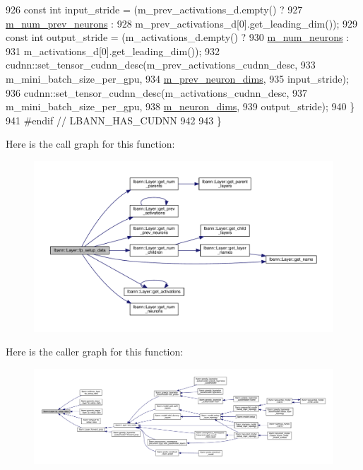 \begin{DoxyCode}
926     \textcolor{keyword}{const} \textcolor{keywordtype}{int} input\_stride = (m\_prev\_activations\_d.empty() ?
927                               \hyperlink{classlbann_1_1Layer_ac7b30f4e28d58204bfcbb76886f9136d}{m\_num\_prev\_neurons} :
928                               m\_prev\_activations\_d[0].get\_leading\_dim());
929     \textcolor{keyword}{const} \textcolor{keywordtype}{int} output\_stride = (m\_activations\_d.empty() ?
930                                \hyperlink{classlbann_1_1Layer_a6b5ebc8a7d9329d8a773ed787e7b41d8}{m\_num\_neurons} :
931                                m\_activations\_d[0].get\_leading\_dim());
932     cudnn::set\_tensor\_cudnn\_desc(m\_prev\_activations\_cudnn\_desc,
933                                  m\_mini\_batch\_size\_per\_gpu,
934                                  \hyperlink{classlbann_1_1Layer_ae204d1a2a79606eaa117273857ff62a3}{m\_prev\_neuron\_dims},
935                                  input\_stride);
936     cudnn::set\_tensor\_cudnn\_desc(m\_activations\_cudnn\_desc,
937                                  m\_mini\_batch\_size\_per\_gpu,
938                                  \hyperlink{classlbann_1_1Layer_abb34bb8031f57a483e2e327a5f229f48}{m\_neuron\_dims},
939                                  output\_stride);
940   \}
941 \textcolor{preprocessor}{  #endif // LBANN\_HAS\_CUDNN}
942 
943 \}
\end{DoxyCode}
Here is the call graph for this function\+:\nopagebreak
\begin{figure}[H]
\begin{center}
\leavevmode
\includegraphics[width=350pt]{classlbann_1_1Layer_af311d901a5f71e4c749454647e9fd9c7_cgraph}
\end{center}
\end{figure}
Here is the caller graph for this function\+:\nopagebreak
\begin{figure}[H]
\begin{center}
\leavevmode
\includegraphics[width=350pt]{classlbann_1_1Layer_af311d901a5f71e4c749454647e9fd9c7_icgraph}
\end{center}
\end{figure}
